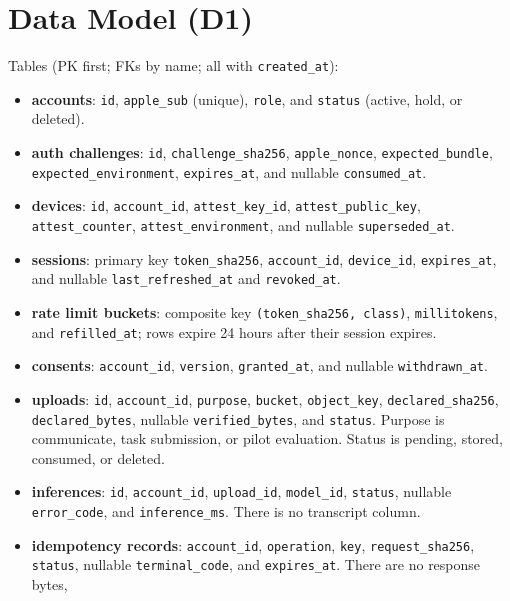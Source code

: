 \documentclass[11pt]{article}
\newcommand{\code}[1]{\texttt{#1}}
\begin{document}
\section{Data Model (D1)}
\label{sec:schema}

Tables (PK first; FKs by name; all with \code{created\_at}):

{\small\sloppy
\begin{itemize}[nosep]
  \item \textbf{accounts}: \code{id}, \code{apple\_sub} (unique), \code{role},
        and \code{status} (active, hold, or deleted).
  \item \textbf{auth challenges}: \code{id}, \code{challenge\_sha256},
        \code{apple\_nonce}, \code{expected\_bundle},
        \code{expected\_environment}, \code{expires\_at}, and nullable
        \code{consumed\_at}.
  \item \textbf{devices}: \code{id}, \code{account\_id},
        \code{attest\_key\_id}, \code{attest\_public\_key},
        \code{attest\_counter}, \code{attest\_environment}, and nullable
        \code{superseded\_at}.
  \item \textbf{sessions}: primary key \code{token\_sha256},
        \code{account\_id}, \code{device\_id}, \code{expires\_at}, and nullable
        \code{last\_refreshed\_at} and \code{revoked\_at}.
  \item \textbf{rate limit buckets}: composite key \code{(token\_sha256, class)},
        \code{millitokens}, and \code{refilled\_at}; rows expire 24 hours after
        their session expires.
  \item \textbf{consents}: \code{account\_id}, \code{version},
        \code{granted\_at}, and nullable \code{withdrawn\_at}.
  \item \textbf{uploads}: \code{id}, \code{account\_id}, \code{purpose},
        \code{bucket}, \code{object\_key}, \code{declared\_sha256},
        \code{declared\_bytes}, nullable \code{verified\_bytes}, and \code{status}.
        Purpose is communicate, task submission, or pilot evaluation. Status is
        pending, stored, consumed, or deleted.
  \item \textbf{inferences}: \code{id}, \code{account\_id}, \code{upload\_id},
        \code{model\_id}, \code{status}, nullable \code{error\_code}, and
        \code{inference\_ms}. There is no transcript column.
  \item \textbf{idempotency records}: \code{account\_id}, \code{operation},
        \code{key}, \code{request\_sha256}, \code{status}, nullable
        \code{terminal\_code}, and \code{expires\_at}. There are no response bytes,

\end{itemize}}
\end{document}
